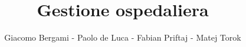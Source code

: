 \title{Gestione ospedaliera}
\author{Giacomo Bergami - Paolo de Luca - Fabian Priftaj - Matej Torok}
\maketitle
\tableofcontents



